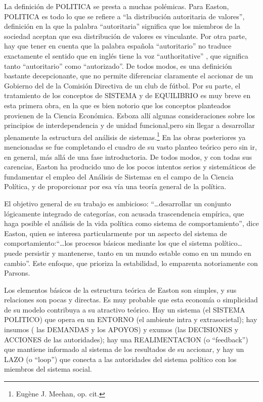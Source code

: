 \documentclass[
]{book}
\begin{document}
La definición de POLITICA se presta a muchas polémicas. Para Easton, POLITICA es todo lo que se refiere a ``la distribución autoritaria de valores'', definición en la que la palabra ``autoritaria'' significa que los miembros de la sociedad aceptan que esa distribución de valores es vinculante. Por otra parte, hay que tener en cuenta que la palabra española ``autoritario'' no traduce exactamente el sentido que en inglés tiene la voz ``authoritative'' , que significa tanto ``autoritario'' como ``autorizado''. De todos modos, es una definición bastante decepcionante, que no permite diferenciar claramente el accionar de un Gobierno del de la Comisión Directiva de un club de fútbol. Por su parte, el tratamiento de los conceptos de SISTEMA y de EQUILIBRIO es muy breve en esta primera obra, en la que es bien notorio que los conceptos planteados provienen de la Ciencia Económica. Esboza allí algunas consideraciones sobre los principios de interdependencia y de unidad funcional,pero sin llegar a desarrollar plenamente la estructura del análisis de sistemas.\footnote{Eugène J. Meehan, op. cit.} En las obras posteriores ya mencionadas se fue completando el cuadro de su vasto planteo teórico pero sin ir, en general, más allá de una fase introductoria. De todos modos, y con todas sus carencias, Easton ha producido uno de los pocos intentos serios y sistemáticos de fundamentar el empleo del Análisis de Sistemas en el campo de la Ciencia Política, y de proporcionar por esa vía una teoría general de la política.

El objetivo general de su trabajo es ambicioso: ``\ldots desarrollar un conjunto lógicamente integrado de categorías, con acusada trascendencia empírica, que haga posible el análisis de la vida política como sistema de comportamiento'', dice Easton, quien se interesa particularmente por un aspecto del sistema de comportamiento:``\ldots los procesos básicos mediante los que el sistema político\ldots puede persistir y mantenerse, tanto en un mundo estable como en un mundo en cambio''. Este enfoque, que prioriza la estabilidad, lo emparenta notoriamente con Parsons.

Los elementos básicos de la estructura teórica de Easton son simples, y sus relaciones son pocas y directas. Es muy probable que esta economía o simplicidad de su modelo contribuya a su atractivo teórico. Hay un sistema (el SISTEMA POLITICO) que opera en un ENTORNO (el ambiente intra y extrasocietal); hay insumos ( las DEMANDAS y los APOYOS) y exumos (las DECISIONES y ACCIONES de las autoridades); hay una REALIMENTACION (o ``feedback'') que mantiene informado al sistema de los resultados de su accionar, y hay un LAZO (o ``loop'') que conecta a las autoridades del sistema político con los miembros del sistema social.
\end{document}
